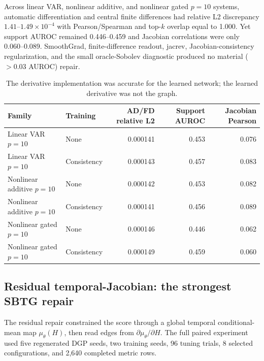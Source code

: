\documentclass[10pt]{article}
\begin{document}
Across linear VAR, nonlinear additive, and nonlinear gated $p=10$ systems, automatic differentiation and central finite differences had relative L2 discrepancy $1.41$--$1.49\times10^{-4}$ with Pearson/Spearman and top-$k$ overlap equal to 1.000. Yet support AUROC remained 0.446--0.459 and Jacobian correlations were only 0.060--0.089. SmoothGrad, finite-difference readout, jacrev, Jacobian-consistency regularization, and the small oracle-Sobolev diagnostic produced no material ($>0.03$ AUROC) repair.

\begin{table}[H]
\centering\small
\begin{tabularx}{\linewidth}{Y L{2.4cm} rrr}
\toprule
Family & Training & AD/FD relative L2 & Support AUROC & Jacobian Pearson \\
\midrule
Linear VAR $p=10$ & None & 0.000141 & 0.453 & 0.076 \\
Linear VAR $p=10$ & Consistency & 0.000143 & 0.457 & 0.083 \\
Nonlinear additive $p=10$ & None & 0.000142 & 0.453 & 0.082 \\
Nonlinear additive $p=10$ & Consistency & 0.000141 & 0.456 & 0.089 \\
Nonlinear gated $p=10$ & None & 0.000146 & 0.446 & 0.062 \\
Nonlinear gated $p=10$ & Consistency & 0.000149 & 0.459 & 0.060 \\
\bottomrule
\end{tabularx}
\caption{The derivative implementation was accurate for the learned network; the learned derivative was not the graph.}
\end{table}

\subsection{Residual temporal-Jacobian: the strongest SBTG repair}

The residual repair constrained the score through a global temporal conditional-mean map $\mu_\theta(H)$, then read edges from $\partial\mu_\theta/\partial H$. The full paired experiment used five regenerated DGP seeds, two training seeds, 96 tuning trials, 8 selected configurations, and 2,640 completed metric rows.
\end{document}
